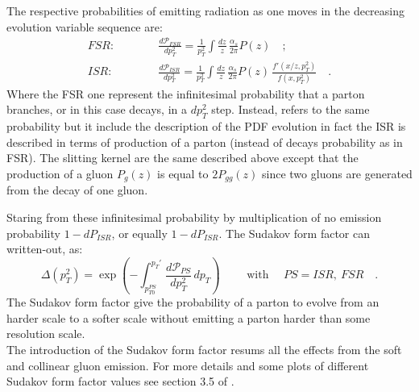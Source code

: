The respective probabilities of emitting radiation as one moves in the decreasing evolution variable sequence are:
\begin{align}
	FSR: \qquad\quad & \frac{d\mathcal{P}_{FSR}}{dp_T^2} = \frac{1}{p_T^2}\displaystyle\int \frac{dz}{z}\,\frac{\alpha_s}{2\pi}P(z)\quad ;\label{eq:FSR1}\\
	ISR: \qquad\quad & \frac{d\mathcal{P}_{ISR}}{dp_T^2} = \frac{1}{p_T^2}\displaystyle\int \frac{dz}{z}\,\frac{\alpha_s}{2\pi}P(z)\,\frac{f'(x/z,p_T^2)}{f(x,p_T^2)}\quad .\label{eq:ISR1}
\end{align}
Where the FSR one represent the infinitesimal probability that a parton branches, or in this case decays, in a $dp_T^2$ step.
Instead,  refers to the same probability but it include the description of the PDF evolution in fact the ISR is described in terms of production of a parton (instead of decays probability as in FSR). The slitting kernel are the same described above except that the production of a gluon $P_g(z)$ is equal to $2P_{gg}(z)$ since two gluons are generated from the decay of one gluon.

Staring from these infinitesimal probability by multiplication of no emission probability $1-dP_{ISR}$, or equally $1-dP_{ISR}$. 
The Sudakov form factor can written-out, as: %
\begin{equation}
	\Delta(p_T^2)=\exp\left( -\displaystyle\int_{p_{T0}^{PS}}^{p_T'} \frac{d\mathcal{P}_{PS}}{dp_T^2} \,dp_T\right) \qquad\text{ with } \quad PS=ISR,\ FSR \quad.
	\label{eq:sudakovFormFactor}
\end{equation}
The Sudakov form factor give the probability of a parton to evolve from an harder scale to a softer scale without emitting a parton harder than some resolution scale.
\\
The introduction of the Sudakov form factor resums all the effects from the soft and collinear gluon emission. For more details and some plots of different Sudakov form factor values see section 3.5 of \cite{Campbell2006}.


